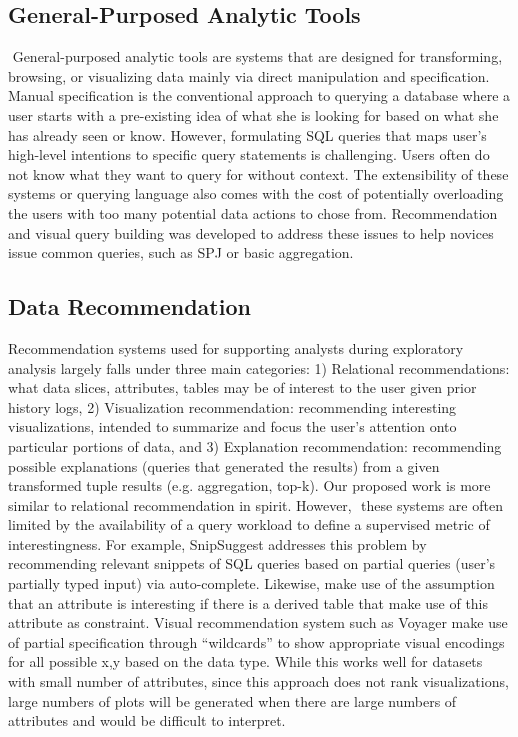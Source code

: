 \documentclass{sig-alternate-05-2015}
\begin{document}
\subsection{General-Purposed Analytic Tools}
 General-purposed analytic tools are systems that are designed for transforming, browsing, or visualizing data mainly via direct manipulation and specification. Manual specification is the conventional approach to querying a database where a user starts with a pre-existing idea of what she is looking for based on what she has already seen or know. However, formulating SQL queries that maps user's high-level intentions to specific query statements is challenging. Users often do not know what they want to query for without context. The extensibility of these systems or querying language also comes with the cost of potentially overloading the users with too many potential data actions to chose from. Recommendation and visual query building was developed to address these issues to help novices issue common queries, such as SPJ or basic aggregation.
\subsection{Data Recommendation}
Recommendation systems used for supporting analysts during exploratory analysis largely falls under three main categories: 1) Relational recommendations: what data slices, attributes, tables may be of interest to the user given prior history logs\cite{Khoussainova2010,Alborzi,Pal2017}, 2) Visualization recommendation: recommending interesting visualizations, intended to summarize and focus the user's attention onto particular portions of data\cite{Vartak2015,Wongsuphasawat2017}, and 3) Explanation recommendation: recommending possible explanations (queries that generated the results) from a given transformed tuple results (e.g. aggregation, top-k)\cite{Chapman2009,Wu2013,Roy2015}. Our proposed work is more similar to relational recommendation in spirit. However,  these systems are often limited by the availability of a query workload to define a supervised metric of interestingness. For example, SnipSuggest addresses this problem by recommending relevant snippets of SQL queries based on partial queries (user's partially typed input) via auto-complete\cite{Khoussainova2010}. Likewise, \cite{Pal2017} make use of the assumption that an attribute is interesting if there is a derived table that make use of this attribute as constraint. Visual recommendation system such as Voyager make use of partial specification through ``wildcards'' to show appropriate visual encodings for all possible x,y based on the data type. While this works well for datasets with small number of attributes, since this approach does not rank visualizations, large numbers of plots will be generated when there are large numbers of attributes and would be difficult to interpret.
\end{document}
